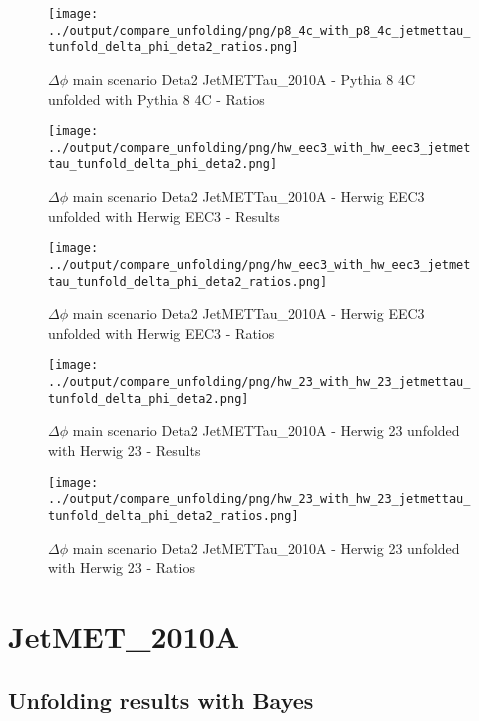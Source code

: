 \documentclass[11pt]{book}
\begin{document}
\begin{figure}[ht]
\centering
\texttt{[image: ../output/compare\_unfolding/png/p8\_4c\_with\_p8\_4c\_jetmettau\_tunfold\_delta\_phi\_deta2\_ratios.png]}
\caption{$\Delta\phi$ main scenario Deta2 JetMETTau\_2010A - Pythia 8 4C unfolded with Pythia 8 4C - Ratios}
\label{p8_p8_jetmettau_tunfold_delta_phi_deta2_b}
\end{figure}

\begin{figure}[ht]
\centering
\texttt{[image: ../output/compare\_unfolding/png/hw\_eec3\_with\_hw\_eec3\_jetmettau\_tunfold\_delta\_phi\_deta2.png]}
\caption{$\Delta\phi$ main scenario Deta2 JetMETTau\_2010A - Herwig EEC3 unfolded with Herwig EEC3 - Results}
\label{hw_eec3_hw_eec3_jetmettau_tunfold_delta_phi_deta2_a}
\end{figure}

\begin{figure}[ht]
\centering
\texttt{[image: ../output/compare\_unfolding/png/hw\_eec3\_with\_hw\_eec3\_jetmettau\_tunfold\_delta\_phi\_deta2\_ratios.png]}
\caption{$\Delta\phi$ main scenario Deta2 JetMETTau\_2010A - Herwig EEC3 unfolded with Herwig EEC3 - Ratios}
\label{hw_eec3_hw_eec3_jetmettau_tunfold_delta_phi_deta2_b}
\end{figure}

\begin{figure}[ht]
\centering
\texttt{[image: ../output/compare\_unfolding/png/hw\_23\_with\_hw\_23\_jetmettau\_tunfold\_delta\_phi\_deta2.png]}
\caption{$\Delta\phi$ main scenario Deta2 JetMETTau\_2010A - Herwig 23 unfolded with Herwig 23 - Results}
\label{hw_23_hw_23_jetmettau_tunfold_delta_phi_deta2_a}
\end{figure}

\begin{figure}[ht]
\centering
\texttt{[image: ../output/compare\_unfolding/png/hw\_23\_with\_hw\_23\_jetmettau\_tunfold\_delta\_phi\_deta2\_ratios.png]}
\caption{$\Delta\phi$ main scenario Deta2 JetMETTau\_2010A - Herwig 23 unfolded with Herwig 23 - Ratios}
\label{hw_23_hw_23_jetmettau_tunfold_delta_phi_deta2_b}
\end{figure}


\clearpage
\section{JetMET\_2010A}
\subsection{Unfolding results with Bayes}
\end{document}
